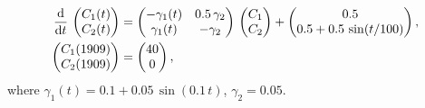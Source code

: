 \documentclass[draft]{agujournal2019}
\newcommand{\deriv}[1]{\frac{\mathrm{d}}{\mathrm{d}#1}}
\begin{document}
    \begin{equation}\label{eqn:CS_two_dim_example}
        \begingroup\makeatletter\def\f@size{10}\check@mathfonts
        \begin{aligned}
            \deriv{t}\,\begin{pmatrix} C_1(t) \\ C_2(t) \end{pmatrix} &= 
            \begin{pmatrix} -\gamma_1(t) & 0.5\,\gamma_2 \\ \gamma_1(t) & -\gamma_2 \end{pmatrix} \,
            \begin{pmatrix} C_1 \\ C_2 \end{pmatrix} +  
            \begin{pmatrix} 0.5 \\ 0.5 + 0.5\,\sin(t/100) \end{pmatrix},\\
            \begin{pmatrix} C_1(1909) \\ C_2(1909) \end{pmatrix} &=
            \begin{pmatrix} 40 \\ 0 \end{pmatrix},
        \end{aligned}
        \endgroup
    \end{equation}
    where $\gamma_1(t)=0.1+0.05\,\sin(0.1\,t)$, $\gamma_2=0.05$.
    
\end{document}
